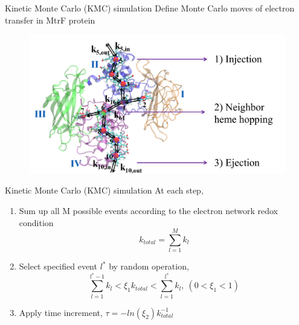 \documentclass{beamer}
\begin{document}
\begin{frame}{Kinetic Monte Carlo (KMC) simulation}
Define Monte Carlo moves of electron transfer in MtrF protein
\begin{figure}
	\centering
	\includegraphics[width=\textwidth]{Pics/KMC_move.png}
\end{figure}
\end{frame}

\begin{frame}{Kinetic Monte Carlo (KMC) simulation}
At each step, 
\begin{enumerate}
\item Sum up all M possible events according to the electron network redox condition
\begin{equation}
	k_{total} = \sum_{l=1}^{M} k_l
\end{equation}
\item Select specified event $l^*$ by random operation, 
\begin{equation}
	\sum_{l=1}^{l^* -1} k_l < \xi_1 k_{total} < \sum_{l=1}^{l^*} k_l,\ (0<\xi_1<1)
\end{equation}
\item Apply time increment, $\tau = - ln(\xi_2)k_{total}^{-1}$
\end{enumerate}
\end{frame}
\end{document}
